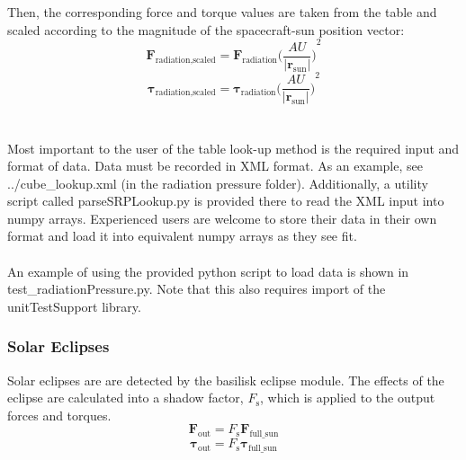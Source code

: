 Then, the corresponding force and torque values are taken from the table and scaled according to the magnitude of the spacecraft-sun position vector:
\begin{equation}
{\mathbf{F}_{\textrm{radiation,scaled}}} = {\mathbf{F}_{\textrm{radiation}}}{\Big(  \frac{AU}{|\textbf{r}_{\textrm{sun}}|}  \Big)}^{2}
\end{equation}
\begin{equation}
{\mathbf{\tau}_{\textrm{radiation,scaled}}} = {\mathbf{\tau}_{\textrm{radiation}}}{\Big(  \frac{AU}{|\textbf{r}_{\textrm{sun}}|}  \Big)}^{2}
\end{equation}\\\\
Most important to the user of the table look-up method is the required input and format of data. Data must be recorded in XML format. As an example, see ../cube\_lookup.xml (in the radiation pressure folder). Additionally, a utility script called parseSRPLookup.py is provided there to read the XML input into numpy arrays. Experienced users are welcome to store their data in their own format and load it into equivalent numpy arrays as they see fit.\\\\
An example of using the provided python script to load data is shown in test\_radiationPressure.py. Note that this also requires import of the unitTestSupport library.\\
\subsubsection{Solar Eclipses}
Solar eclipses are are detected by the basilisk eclipse module. The effects of the eclipse are calculated into a shadow factor, $F_{\mathrm{s}}$, which is applied to the output forces and torques. 
\begin{equation}
\mathbf{F}_{\mathrm{out}} = F_{\mathrm{s}}\mathbf{F}_{\mathrm{full\_sun}}
\end{equation}
\begin{equation}
\bm{\tau}_{\mathrm{out}} = F_{\mathrm{s}}\bm{\tau}_{\mathrm{full\_sun}}
\end{equation}
